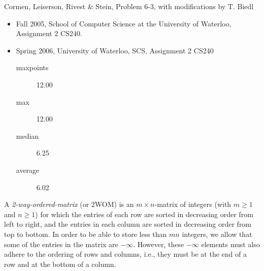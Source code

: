 \begin{authorship}
Cormen, Leiserson, Rivest \& Stein, Problem 6-3, with modifications by T. Biedl
\end{authorship}
\begin{usage}
\begin{itemize}
\item Fall 2005, School of Computer Science at the University of Waterloo, Assignment 2 CS240.
\item Spring 2006, University of Waterloo, SCS, Assignment 2 CS240
\begin{description}
\item[maxpoints] 12.00
\item[max] 12.00
\item[median] 6.25
\item[average] 6.02
\end{description}


\end{itemize}
\end{usage}
A {\em 2-way-ordered-matrix} (or 2WOM) is an 
$m\times n$-matrix of integers (with $m\geq 1$
and $n\geq 1$) for which the entries of each row are sorted in decreasing
order from left to right, and the entries in each column are sorted in
decreasing order from top to bottom.  In order to be able to store less
than $mn$ integers, we allow that some of the entries in the matrix are
$-\infty$.  However, these $-\infty$ elements must also adhere to the ordering
of rows and columns, i.e., they must be at the end of a row and at the
bottom of a column.  

